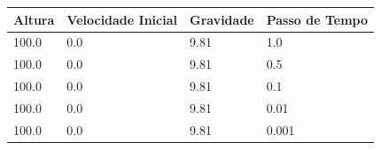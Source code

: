 \begin{tabular}{llll}
\toprule
Altura & Velocidade Inicial & Gravidade & Passo de Tempo \\
\midrule
100.0 & 0.0 & 9.81 & 1.0 \\
100.0 & 0.0 & 9.81 & 0.5 \\
100.0 & 0.0 & 9.81 & 0.1 \\
100.0 & 0.0 & 9.81 & 0.01 \\
100.0 & 0.0 & 9.81 & 0.001 \\
\bottomrule
\end{tabular}
